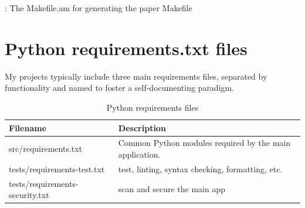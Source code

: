 \begin{mybox}{\thetcbcounter: The Makefile.am for generating the paper Makefile}
    
\end{mybox}
\vspace{2mm}

\section{\label{sec:make}Python requirements.txt files}

\justifying
My projects typically include three main requirements files, separated by functionality and named to foster a self-documenting paradigm.

\begin{table}[ht]
    \centering
    \begin{tabular}{|l|l|}\hline
        Filename & Description \\\hline
        src/requirements.txt & Common Python modules required by the main application.    \\\hline
        tests/requirements-test.txt & test, linting, syntax checking, formatting, etc.    \\\hline
        tests/requirements-security.txt  &  scan and secure the main app   \\\hline
    \end{tabular}
    \caption{Python requirements files}
    \label{Requirements}
\end{table}

\clearpage
\begin{versionhistory}
\end{versionhistory}
\nocite{*}




